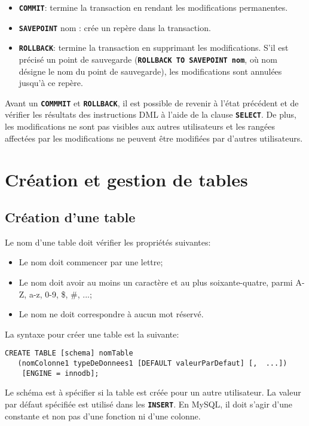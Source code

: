 \documentclass[a4paper, 12pt]{report}
\newcommand{\textSQL}[1]{\texttt{\textbf{#1}}}
\theoremstyle{definition} \newtheorem{ex}{Exemple}
\begin{document}
\begin{itemize}
\item \textSQL{COMMIT}: termine la transaction en rendant les modifications permanentes.
\item \textSQL{SAVEPOINT} nom : crée un repère dans la transaction.
\item \textSQL{ROLLBACK}: termine la transaction en supprimant les modifications. S'il est précisé un point de sauvegarde (\textSQL{ROLLBACK TO SAVEPOINT nom}, où nom désigne le nom du point de sauvegarde), les modifications sont annulées jusqu'à ce repère.
\end{itemize}

Avant un \textSQL{COMMMIT} et \textSQL{ROLLBACK}, il est possible de revenir à l'état précédent et de vérifier les résultats des instructions DML à l'aide de la clause \textSQL{SELECT}. De plus, les modifications ne sont pas visibles aux autres utilisateurs et les rangées affectées par les modifications ne peuvent être modifiées par d'autres utilisateurs.

\chapter{Création et gestion de tables}
\section{Création d'une table}
Le nom d'une table doit vérifier les propriétés suivantes:
\begin{itemize}
  \item Le nom doit commencer par une lettre;
	\item Le nom doit avoir au moins un caractère et au plus soixante-quatre, parmi A-Z, a-z, 0-9, \$, \#, ...;
	\item Le nom ne doit correspondre à aucun mot réservé.
\end{itemize}

La syntaxe pour créer une table est la suivante:
\begin{lstlisting}[frame=single]
CREATE TABLE [schema] nomTable
   (nomColonne1 typeDeDonnees1 [DEFAULT valeurParDefaut] [,  ...])
	[ENGINE = innodb];
\end{lstlisting}
Le schéma est à spécifier si la table est créée pour un autre utilisateur. La valeur par défaut spécifiée est utilisé dans les \textSQL{INSERT}. En MySQL, il doit s'agir d'une constante et non pas d'une fonction ni d'une colonne.
\end{document}
